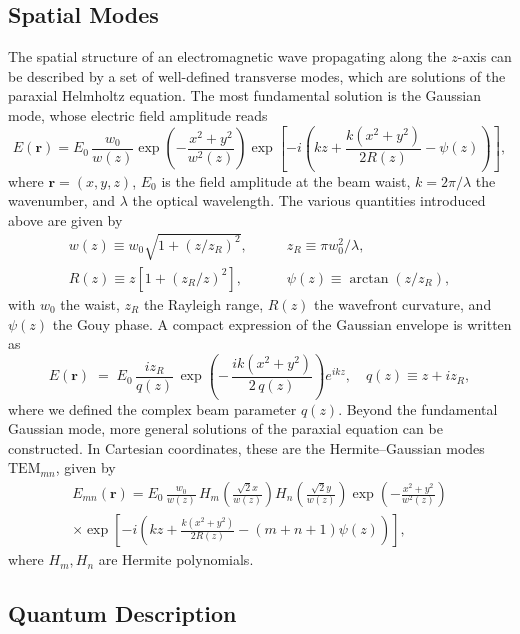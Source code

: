 \subsection{Spatial Modes}
The spatial structure of an electromagnetic wave propagating along the $z$-axis can be described by a set of well-defined transverse modes, which are solutions of the paraxial Helmholtz equation. The most fundamental solution is the Gaussian mode, whose electric field amplitude reads
\begin{equation}
E(\mathbf r) = E_0 \, \frac{w_0}{w(z)} 
\exp\!\left(-\frac{x^2+y^2}{w^2(z)}\right) 
\exp\!\left[-i\!\left(kz + \frac{k(x^2+y^2)}{2R(z)} - \psi(z)\right)\right],
\end{equation}
where $\mathbf r = (x, y, z)$, $E_0$ is the field amplitude at the beam waist, $k = 2\pi/\lambda$ the wavenumber, and $\lambda$ the optical wavelength. The various quantities introduced above are given by
\begin{equation}
  \begin{split}
w(z) \equiv w_0 \sqrt{1+(z/z_R)^2}, \quad & \quad
z_R \equiv \pi w_0^2/\lambda, \\
R(z) \equiv z\left[1+(z_R/z)^2\right], \quad &\quad
\psi(z) \equiv \arctan(z/z_R),
  \end{split}
\end{equation}
with $w_0$ the waist, $z_R$ the Rayleigh range, $R(z)$ the wavefront curvature, and $\psi(z)$ the Gouy phase. 
A compact expression of the Gaussian envelope is written as
\begin{equation}
E(\mathbf r) \;=\; E_0 \,\frac{i z_R}{q(z)} \,
\exp\!\left(-\,\frac{i k (x^2+y^2)}{2\,q(z)}\right) e^{i k z}, \quad q(z) \equiv z + i z_R,
\end{equation}
where we defined the complex beam parameter $q(z)$. 
Beyond the fundamental Gaussian mode, more general solutions of the paraxial equation can be constructed. In Cartesian coordinates, these are the Hermite--Gaussian modes $\mathrm{TEM}_{mn}$, given by
\begin{multline}
E_{mn}(\mathbf{r}) = E_0 \, \frac{w_0}{w(z)} \,
H_m\!\left(\frac{\sqrt{2}x}{w(z)}\right) 
H_n\!\left(\frac{\sqrt{2}y}{w(z)}\right) 
\exp\!\left(-\frac{x^2+y^2}{w^2(z)}\right) \\
\times \exp\!\left[-i\!\left(kz + \frac{k(x^2+y^2)}{2R(z)} - (m+n+1)\psi(z)\right)\right],
\end{multline}
where $H_m, H_n$ are Hermite polynomials. 
\subsection{Quantum Description}

